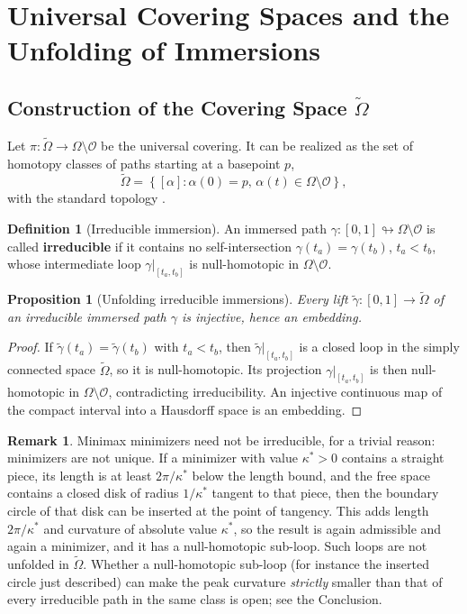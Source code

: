 \documentclass[11pt,reqno]{amsart}
\newtheorem{proposition}[theorem]{Proposition}
\theoremstyle{definition}
\newtheorem{definition}[theorem]{Definition}
\newtheorem{remark}[theorem]{Remark}
\newcommand{\Cover}{\widetilde{\Omega}}
\numberwithin{equation}{section}
\begin{document}
\section{Universal Covering Spaces and the Unfolding of Immersions}

\subsection{Construction of the Covering Space \texorpdfstring{$\Cover$}{Omega-tilde}}
Let $\pi: \Cover \to \Omega \setminus \mathcal{O}$ be the universal covering. It can be realized as the set of homotopy classes of paths starting at a basepoint $p$,
\begin{equation}
\Cover = \left\{ [\alpha] : \alpha(0) = p, \, \alpha(t) \in \Omega \setminus \mathcal{O} \right\},
\end{equation}
with the standard topology \cite{hatcher2002}.

\begin{definition}[Irreducible immersion]
An immersed path $\gamma: [0, 1] \looparrowright \Omega \setminus \mathcal{O}$ is called \textbf{irreducible} if it contains no self-intersection $\gamma(t_a) = \gamma(t_b)$, $t_a < t_b$, whose intermediate loop $\gamma|_{[t_a, t_b]}$ is null-homotopic in $\Omega \setminus \mathcal{O}$.
\end{definition}

\begin{proposition}[Unfolding irreducible immersions]
\label{thm:unfolding}
Every lift $\tilde{\gamma}: [0, 1] \to \Cover$ of an irreducible immersed path $\gamma$ is injective, hence an embedding.
\end{proposition}

\begin{proof}
If $\tilde{\gamma}(t_a) = \tilde{\gamma}(t_b)$ with $t_a < t_b$, then $\tilde\gamma|_{[t_a, t_b]}$ is a closed loop in the simply connected space $\Cover$, so it is null-homotopic. Its projection $\gamma|_{[t_a, t_b]}$ is then null-homotopic in $\Omega \setminus \mathcal{O}$, contradicting irreducibility. An injective continuous map of the compact interval into a Hausdorff space is an embedding.
\end{proof}

\begin{remark}
Minimax minimizers need not be irreducible, for a trivial reason: minimizers are not unique. If a minimizer with value $\kappa^* > 0$ contains a straight piece, its length is at least $2\pi/\kappa^*$ below the length bound, and the free space contains a closed disk of radius $1/\kappa^*$ tangent to that piece, then the boundary circle of that disk can be inserted at the point of tangency. This adds length $2\pi/\kappa^*$ and curvature of absolute value $\kappa^*$, so the result is again admissible and again a minimizer, and it has a null-homotopic sub-loop. Such loops are not unfolded in $\Cover$. Whether a null-homotopic sub-loop (for instance the inserted circle just described) can make the peak curvature \emph{strictly} smaller than that of every irreducible path in the same class is open; see the Conclusion.
\end{remark}
\end{document}
